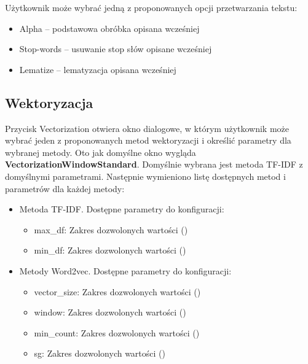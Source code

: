 			Użytkownik może wybrać jedną z proponowanych opcji przetwarzania tekstu:

			\begin{itemize}
				\item Alpha -- podstawowa obróbka opisana wcześniej
				\item Stop-words -- usuwanie stop słów opisane wcześniej
				\item Lematize -- lematyzacja opisana wcześniej
			\end{itemize}
			
	\subsection{Wektoryzacja}
		Przycisk Vectorization otwiera okno dialogowe, w którym użytkownik może wybrać jeden z proponowanych metod wektoryzacji i określić parametry dla wybranej metody. Oto jak domyślne okno wygląda \textbf{VectorizationWindowStandard}. Domyślnie wybrana jest metoda TF-IDF z domyślnymi parametrami.
		Następnie wymieniono listę dostępnych metod i parametrów dla każdej metody:
		\begin{itemize}
			\item Metoda TF-IDF. Dostępne parametry do konfiguracji:
			\begin{itemize}
				\item max\_df: Zakres dozwolonych wartości ()
				\item min\_df: Zakres dozwolonych wartości ()
			\end{itemize}
			\item Metody Word2vec. Dostępne parametry do konfiguracji:
			\begin{itemize}
				\item vector\_size: Zakres dozwolonych wartości ()
				\item window: Zakres dozwolonych wartości ()
				\item min\_count: Zakres dozwolonych wartości ()
				\item sg: Zakres dozwolonych wartości ()
			\end{itemize}
		\end{itemize}
			

